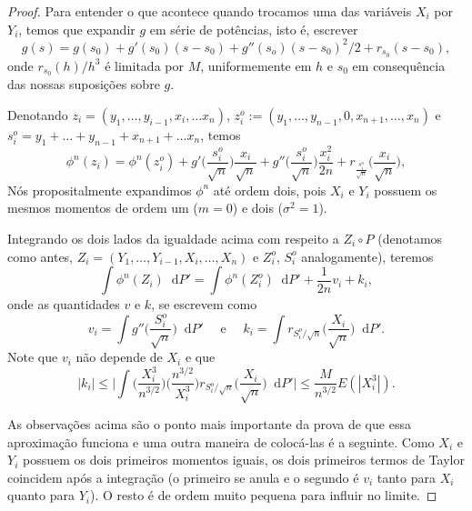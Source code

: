 \documentclass[reqno, final]{book}
\newcommand*\1{\mathds{1}}
\renewcommand*\d{\mathop{}\!\mathrm{d}}
\begin{document}
\begin{proof}
  Para entender o que acontece quando trocamos uma das variáveis $X_i$ por $Y_i$, temos que expandir $g$ em série de potências, isto é, escrever
  \begin{equation}
    g(s) = g(s_0) + g'(s_0)(s - s_0) + g''(s_o)(s-s_0)^2/2 + r_{s_0}(s - s_0),
  \end{equation}
  onde $r_{s_0}(h)/h^3$ é limitada por $M$, uniformemente em $h$ e $s_0$ em consequência das nossas suposições sobre $g$.

  Denotando $z_i = (y_1, \dots, y_{i-1}, x_i, \dots x_n)$, $z_i^o := (y_1, \dots, y_{n-1}, 0, x_{n+1}, \dots, x_n)$ e $s_i^o = y_1 + \dots + y_{n-1} + x_{n+1} + \dots x_n$, temos
  \begin{equation}
    \phi^n(z_i) %
    = \phi^n(z_i^o) + g' \Big( \frac{s_i^o}{\sqrt{n}} \Big) \frac{x_i}{\sqrt{n}} + g'' \Big( \frac{s_i^o}{\sqrt{n}} \Big) \frac{x_i^2}{2n} + r_{\frac{s_i^o}{\sqrt{n}}} \Big( \frac{x_i}{\sqrt{n}} \Big),
  \end{equation}
  Nós propositalmente expandimos $\phi^n$ até ordem dois, pois $X_i$ e $Y_i$ possuem os mesmos momentos de ordem um ($m=0$) e dois ($\sigma^2=1$).

  Integrando os dois lados da igualdade acima com respeito a $Z_i \circ P$ (denotamos como antes, $Z_i = (Y_1, \dots, Y_{i-1}, X_i, \dots, X_n)$ e $Z_i^o$, $S_i^o$ analogamente), teremos
  \begin{equation}
    \int \phi^n(Z_i) \d P' = \int \phi^n(Z_i^o) \d P' + \frac{1}{2n} v_i + k_i,
  \end{equation}
  onde as quantidades $v$ e $k$, se escrevem como
  \begin{equation}
    v_i = \int g'' \Big( \frac{S_i^o}{\sqrt{n}} \Big) \d P' \quad \text{ e } \quad k_i = \int r_{S_i^o/\sqrt{n}} \Big(\frac{X_i}{\sqrt{n}}\Big) \d P'.
  \end{equation}
  Note que $v_i$ não depende de $X_i$ e que
  \begin{equation}
    |k_i| \leq \Big| \int \Big(\frac{X_i^3}{n^{3/2}}\Big) \Big(\frac{n^{3/2}}{X_i^3}\Big) r_{S_i^o/\sqrt{n}} \Big(\frac{X_i}{\sqrt{n}}\Big) \d P' \Big| \leq \frac{M}{n^{3/2}} E(|X_i^3|).
  \end{equation}

  As observações acima são o ponto mais importante da prova de que essa aproximação funciona e uma outra maneira de colocá-las é a seguinte.
  Como $X_i$ e $Y_i$ possuem os dois primeiros momentos iguais, os dois primeiros termos de Taylor coincidem após a integração (o primeiro se anula e o segundo é $v_i$ tanto para $X_i$ quanto para $Y_i$).
  O resto é de ordem muito pequena para influir no limite.


\end{proof}
\end{document}
